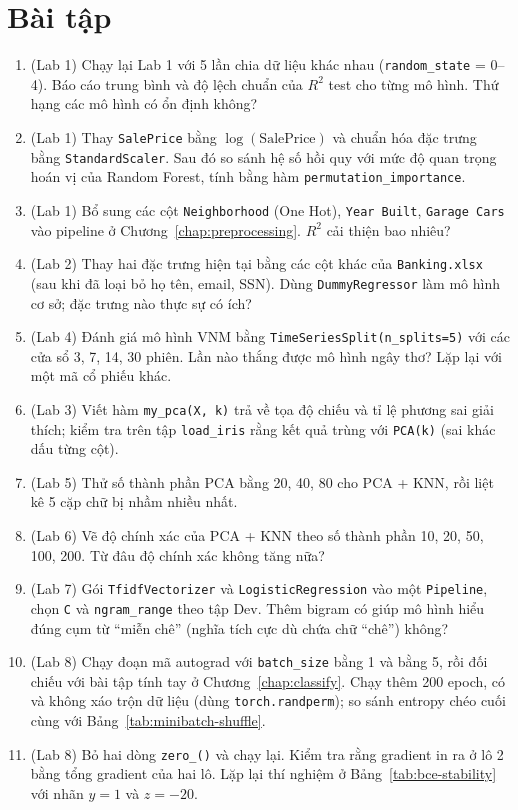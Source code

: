 \section{Bài tập}
\begin{enumerate}
    \item (Lab 1) Chạy lại Lab 1 với 5 lần chia dữ liệu khác nhau (\texttt{random\_state} = 0--4). Báo cáo trung bình và độ lệch chuẩn của $R^2$ test cho từng mô hình. Thứ hạng các mô hình có ổn định không?
    \item (Lab 1) Thay \texttt{SalePrice} bằng $\log(\text{SalePrice})$ và chuẩn hóa đặc trưng bằng \texttt{StandardScaler}. Sau đó so sánh hệ số hồi quy với mức độ quan trọng hoán vị của Random Forest, tính bằng hàm \texttt{permutation\_\allowbreak importance}.
    \item (Lab 1) Bổ sung các cột \texttt{Neighborhood} (One Hot), \texttt{Year Built}, \texttt{Garage Cars} vào pipeline ở Chương~\ref{chap:preprocessing}. $R^2$ cải thiện bao nhiêu?
    \item (Lab 2) Thay hai đặc trưng hiện tại bằng các cột khác của \texttt{Banking.xlsx} (sau khi đã loại bỏ họ tên, email, SSN). Dùng \texttt{DummyRegressor} làm mô hình cơ sở; đặc trưng nào thực sự có ích?
    \item (Lab 4) Đánh giá mô hình VNM bằng \texttt{TimeSeriesSplit(n\_splits=5)} với các cửa sổ 3, 7, 14, 30 phiên. Lần nào thắng được mô hình ngây thơ? Lặp lại với một mã cổ phiếu khác.
    \item (Lab 3) Viết hàm \texttt{my\_pca(X, k)} trả về tọa độ chiếu và tỉ lệ phương sai giải thích; kiểm tra trên tập \texttt{load\_iris} rằng kết quả trùng với \texttt{PCA(k)} (sai khác dấu từng cột).
    \item (Lab 5) Thử số thành phần PCA bằng 20, 40, 80 cho PCA + KNN, rồi liệt kê 5 cặp chữ bị nhầm nhiều nhất.
    \item (Lab 6) Vẽ độ chính xác của PCA + KNN theo số thành phần 10, 20, 50, 100, 200. Từ đâu độ chính xác không tăng nữa?
    \item (Lab 7) Gói \texttt{TfidfVectorizer} và \texttt{LogisticRegression} vào một \texttt{Pipeline}, chọn \texttt{C} và \texttt{ngram\_range} theo tập Dev. Thêm bigram có giúp mô hình hiểu đúng cụm từ ``miễn chê'' (nghĩa tích cực dù chứa chữ ``chê'') không?
    \item (Lab 8) Chạy đoạn mã autograd với \texttt{batch\_size} bằng 1 và bằng 5, rồi đối chiếu với bài tập tính tay ở Chương~\ref{chap:classify}. Chạy thêm 200 epoch, có và không xáo trộn dữ liệu (dùng \texttt{torch.randperm}); so sánh entropy chéo cuối cùng với Bảng~\ref{tab:minibatch-shuffle}.
    \item (Lab 8) Bỏ hai dòng \texttt{zero\_()} và chạy lại. Kiểm tra rằng gradient in ra ở lô 2 bằng tổng gradient của hai lô. Lặp lại thí nghiệm ở Bảng~\ref{tab:bce-stability} với nhãn $y = 1$ và $z = -20$.
\end{enumerate}

